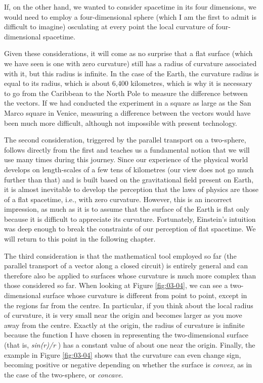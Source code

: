 If, on the other hand, we wanted to consider spacetime in its four dimensions, we would
need to employ a four-dimensional sphere (which I am the first to admit is difficult to
imagine) osculating at every point the local curvature of
four-dimensional spacetime.

Given these considerations, it will come as no surprise that a flat surface (which we
have seen is one with zero curvature) still has a radius of curvature associated with
it, but this radius is infinite. In the case of the Earth, the
curvature radius is equal to its radius, which is about 6,400
kilometres, which is why it is necessary to go from the Caribbean to the North Pole to
measure the difference between the vectors. If we had conducted the experiment in a
square as large as the San Marco square in Venice, measuring a difference between the
vectors would have been much more difficult, although not impossible
with present technology.

The second consideration, triggered by the parallel transport on a
two-sphere, follows directly from the first and teaches us a
fundamental notion that we will use many times during this journey. Since our experience
of the physical world develops on length-scales of a few tens of kilometres (our view
does not go much further than that) and is built based on the gravitational field
present on Earth, it is almost inevitable to develop the perception
that the laws of physics are those of a flat spacetime, i.e., with zero curvature.
However, this is an incorrect impression, as much as it is to assume that the surface of
the Earth is flat only because it is difficult to appreciate its curvature. Fortunately,
Einstein's intuition was deep enough to break the constraints of our perception of flat
spacetime. We will return to this point in the following chapter.

The third consideration is that the mathematical tool employed so far (the parallel
transport of a vector along a closed circuit) is entirely general and can therefore also
be applied to surfaces whose curvature is much more complex than
those considered so far. When looking at Figure \ref{fig:03-04}, we can see a two-dimensional
surface whose curvature is different from point to point, except in the regions far from
the centre. In particular, if you think about the local radius of curvature, it is very
small near the origin and becomes larger as you move away from the centre. Exactly at
the origin, the radius of curvature is infinite because the function I have chosen in
representing the two-dimensional surface (that is, \emph{sin(r)/r} ) has a constant
value of about one near the origin. Finally, the example in Figure \ref{fig:03-04} shows that the
curvature can even change sign, becoming positive or negative
depending on whether the surface is \emph{convex}, as in the case of the
two-sphere, or \emph{concave}.

